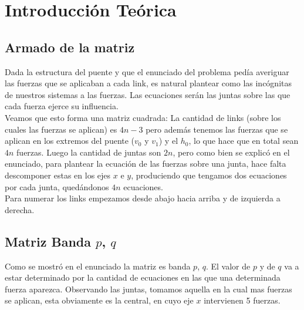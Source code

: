 \section{Introducción Teórica}

\subsection{Armado de la matriz}

Dada la estructura del puente y que el enunciado del problema pedía averiguar las fuerzas que se aplicaban a cada link, es natural plantear como las incógnitas de nuestros sistemas a las fuerzas. Las ecuaciones serán las juntas sobre las que cada fuerza ejerce su influencia.\\

Veamos que esto forma una matriz cuadrada: La cantidad de links (sobre los cuales las fuerzas se aplican) es $4n - 3$ pero además tenemos las fuerzas que se aplican en los extremos del puente ($v_0$ y $v_1$) y el $h_0$, lo que hace que en total sean $4n$ fuerzas. Luego la cantidad de juntas son $2n$, pero como bien se explicó en el enunciado, para plantear la ecuación de las fuerzas sobre una junta, hace falta descomponer estas en los ejes $x$ e $y$, produciendo que tengamos dos ecuaciones por cada junta, quedándonos $4n$ ecuaciones.\\

Para numerar los links empezamos desde abajo hacia arriba y de izquierda a derecha.

\subsection{Matriz Banda $p$, $q$}

Como se mostró en el enunciado la matriz es banda $p$, $q$. El valor de $p$ y de $q$ va a estar determinado por la cantidad de ecuaciones en las que una determinada fuerza aparezca. Observando las juntas, tomamos aquella en la cual mas fuerzas se aplican, esta obviamente es la central, en cuyo eje $x$ intervienen 5 fuerzas. 